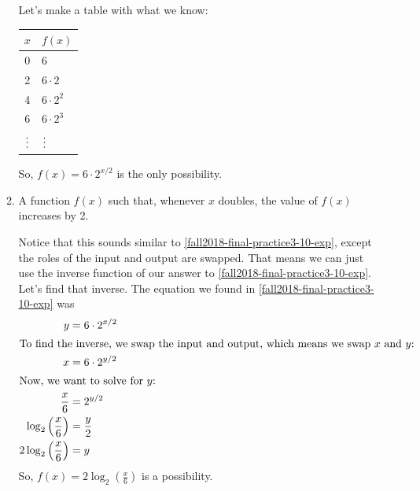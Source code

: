 \documentclass{article}
\theoremstyle{theorem}
\begin{document}
\begin{enumerate}
\begin{enumerate}
    \begin{solution}
      Let's make a table with what we know:
      \begin{center}
        \begin{tabular}{c | l}
          $x$ & $f(x)$ \\
          \hline
          0 & 6 \\
          2 & $6 \cdot 2$ \\
          4 & $6 \cdot 2^2$ \\
          6 & $6 \cdot 2^3$ \\
          $\mathrel{\makebox[\widthof{6}]{\vdots}}$ & $\mathrel{\makebox[\widthof{6}]{\vdots}}$
        \end{tabular}
      \end{center}
      So, $\boxed{f(x) = 6 \cdot 2^{x/2}}$ is the only possibility. 
    \end{solution} 

  \item %

    \begin{problem}[\vfill\newpage]
      A function $f(x)$ such that, whenever $x$ doubles, the value of $f(x)$ increases by 2.
    \end{problem}

    \begin{solution}
      Notice that this sounds similar to \ref{fall2018-final-practice3-10-exp}, except the roles of the input and output are swapped. That means we can just use the inverse function of our answer to \ref{fall2018-final-practice3-10-exp}. Let's find that inverse. The equation we found in \ref{fall2018-final-practice3-10-exp} was
      \begin{align*}
        y &= 6 \cdot 2^{x/2} \\
        \intertext{To find the inverse, we swap the input and output, which means we swap $x$ and $y$:}
        x &= 6 \cdot 2^{y / 2} \\
        \intertext{Now, we want to solve for $y$:}
        \frac{x}{6} &= 2^{y/2} \\
        \log_2 \left( \frac{x}{6} \right) &= \frac{y}{2} \\
        2 \log_2 \left( \frac{x}{6} \right) &= y
      \end{align*}
      So, $\boxed{f(x) = 2 \log_2 \left( \frac{x}{6} \right)}$ is a possibility. 
    \end{solution}

  \end{enumerate}


\end{enumerate}
\end{document}
